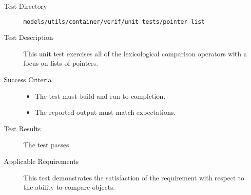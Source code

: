 \label{test:pointer}
\begin{description}
\item[Test Directory]
{\tt models/utils/container/verif/unit\_tests/pointer\_list}

\item[Test Description]
This unit test exercises all of the lexicological comparison operators
with a focus on lists of pointers.

\item[Success Criteria]
\begin{itemize}
\item The test must build and run to completion.
\item The reported output must match expectations.
\end{itemize}

\item[Test Results]
The test passes.

\item[Applicable Requirements]
This test demonstrates the satisfaction of the 
requirement  with respect to 
the ability to compare objects.

\end{description}
